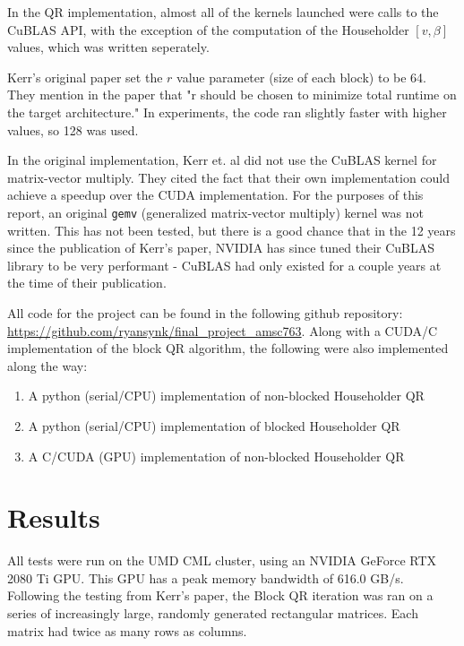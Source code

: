 \documentclass[12pt]{article}
\begin{document}
In the QR implementation, almost all of the kernels launched were calls to the CuBLAS API,
with the exception of the computation of the Householder $[v, \beta]$ values, which was 
written seperately.

Kerr's original paper set the $r$ value parameter (size of each block) to be 64. They
mention in the paper that "r should be chosen to minimize total runtime on the target
architecture." In experiments, the code ran slightly faster with higher values, so 128
was used.

In the original implementation, Kerr et. al did not use the CuBLAS kernel for 
matrix-vector multiply. They cited the fact that their own implementation could 
achieve a speedup over the CUDA implementation. For the purposes of this report, 
an original \texttt{gemv} (generalized matrix-vector multiply) kernel was not written. 
This has not been tested, but there is a good chance that in the 12 years since the
publication of Kerr's paper, NVIDIA has since tuned their CuBLAS library to be very
performant - CuBLAS had only existed for a couple years at the time of their publication.

All code for the project can be found in the following github repository: 
\url{https://github.com/ryansynk/final_project_amsc763}. Along with a 
CUDA/C implementation of the block QR algorithm, the following were also
implemented along the way:
\begin{enumerate}
    \item A python (serial/CPU) implementation of non-blocked Householder QR
    \item A python (serial/CPU) implementation of blocked Householder QR
    \item A C/CUDA (GPU) implementation of non-blocked Householder QR
\end{enumerate}

\par\null\par

\section*{Results}
\par\null\par

All tests were run on the UMD CML cluster, using an NVIDIA GeForce RTX 2080 Ti GPU. This GPU
has a peak memory bandwidth of 616.0 GB/s. Following the testing from Kerr's paper, the Block 
QR iteration was ran on a series of increasingly large, randomly generated rectangular 
matrices. Each matrix had twice as many rows as columns.
\end{document}
